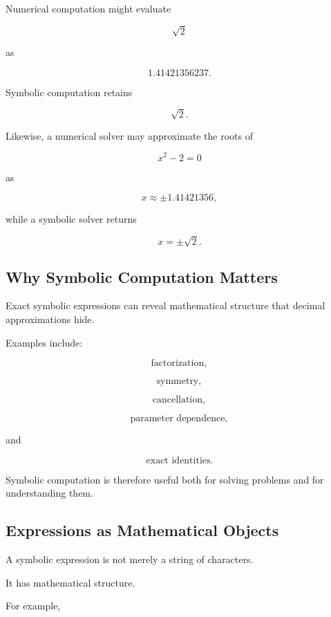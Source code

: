 Numerical computation might evaluate

\[
\sqrt{2}
\]

as

\[
\boxed{
1.41421356237.
}
\]

Symbolic computation retains

\[
\boxed{
\sqrt{2}.
}
\]

Likewise, a numerical solver may approximate the roots of

\[
x^2-2=0
\]

as

\[
\boxed{
x\approx\pm1.41421356,
}
\]

while a symbolic solver returns

\[
\boxed{
x=\pm\sqrt{2}.
}
\]

\subsection{Why Symbolic Computation Matters}
\label{subsec:why-symbolic-computation-matters}

Exact symbolic expressions can reveal mathematical structure that decimal
approximations hide.

Examples include:

\[
\boxed{
\text{factorization},
}
\]

\[
\boxed{
\text{symmetry},
}
\]

\[
\boxed{
\text{cancellation},
}
\]

\[
\boxed{
\text{parameter dependence},
}
\]

and

\[
\boxed{
\text{exact identities}.
}
\]

Symbolic computation is therefore useful both for solving problems and for
understanding them.

\subsection{Expressions as Mathematical Objects}
\label{subsec:symbolic-expressions}

A symbolic expression is not merely a string of characters.

It has mathematical structure.

For example,

